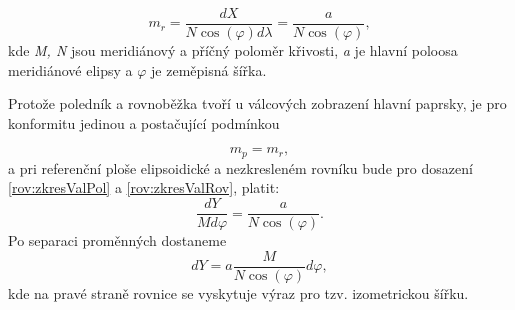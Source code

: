 \begin{equation}
m_{r} = \dfrac{dX}{N \cos{\left(\varphi\right)d\lambda}} = \dfrac{a}{N\cos{\left(\varphi\right)}},
\label{rov:zkresValRov}
\end{equation}
kde \textit{M, N} jsou meridiánový a příčný poloměr křivosti, \textit{a} je hlavní poloosa meridiánové elipsy a $\varphi$ je zeměpisná šířka.

Protože poledník a rovnoběžka tvoří u válcových zobrazení hlavní paprsky, je pro konformitu jedinou a postačující podmínkou

$$m_{p} = m_{r},$$ 
a pri referenční ploše elipsoidické a nezkresleném rovníku bude pro dosazení \ref{rov:zkresValPol} a \ref{rov:zkresValRov}, platit:
\begin{equation}
\dfrac{dY}{M d\varphi} = \dfrac{a}{N\cos{\left(\varphi\right)}}.
\end{equation}
Po separaci proměnných dostaneme
\begin{equation}
dY = a\dfrac{M}{N\cos{\left(\varphi\right)}}d\varphi,
\label{rov:dY}
\end{equation}
kde na pravé straně rovnice se vyskytuje výraz pro tzv. izometrickou šířku.

